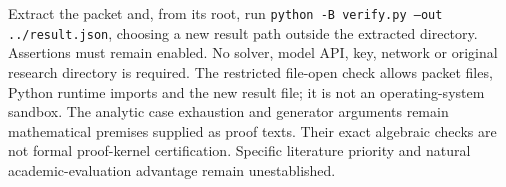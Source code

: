 \documentclass[pdflatex,sn-mathphys-num]{sn-jnl}
\theoremstyle{thmstyleone}
\theoremstyle{thmstylethree}
\theoremstyle{thmstyletwo}
\begin{document}
Extract the packet and, from its root, run
\texttt{python -B verify.py --out ../result.json}, choosing a new result
path outside the extracted directory. Assertions must remain enabled.
No solver, model API, key, network or original research directory is required.
The restricted file-open check allows packet files, Python runtime imports
and the new result file; it is not an operating-system sandbox.
The analytic case exhaustion and generator arguments remain mathematical
premises supplied as proof texts. Their exact algebraic checks are not
formal proof-kernel certification. Specific literature priority and
natural academic-evaluation advantage remain unestablished.


\end{document}
